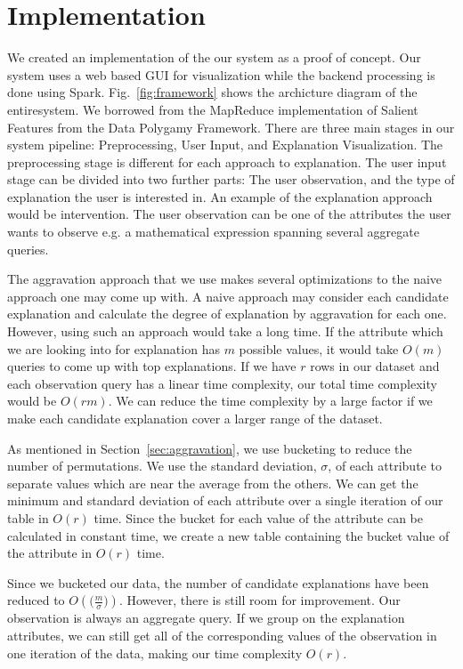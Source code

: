 \section{Implementation}
\label{sec:implementation}
We created an implementation of the our system as a proof of concept. Our system uses a web based GUI for visualization while the backend processing is done using Spark\citep{shanahan2015large}. Fig.~\ref{fig:framework} shows the archicture diagram of the entiresystem. We borrowed from the MapReduce implementation of Salient Features from the Data Polygamy Framework\citep{chirigati2016data}. There are three main stages in our system pipeline: Preprocessing, User Input, and Explanation Visualization. The preprocessing stage is different for each approach to explanation. The user input stage can be divided into two further parts: The user observation, and the type of explanation the user is interested in. An example of the explanation approach would be intervention. The user observation can be one of the attributes the user wants to observe e.g. a mathematical expression spanning several aggregate queries.


\label{aggravation_impl}
The aggravation approach that we use makes several optimizations to the naive approach one may come up with. A naive approach may consider each candidate explanation and calculate the degree of explanation by aggravation for each one. However, using such an approach would take a long time. If the attribute which we are looking into for explanation has $m$ possible values, it would take $O(m)$ queries to come up with top explanations. If we have $r$ rows in our dataset and each observation query has a linear time complexity, our total time complexity would be $O(rm)$. We can reduce the time complexity by a large factor if we make each candidate explanation cover a larger range of the dataset.

As mentioned in Section~\ref{sec:aggravation}, we use bucketing to reduce the number of permutations. We use the standard deviation, $\sigma$, of each attribute to separate values which are near the average from the others. We can get the minimum and standard deviation of each attribute over a single iteration of our table in $O(r)$ time. Since the bucket for each value of the attribute can be calculated in constant time, we create a new table containing the bucket value of the attribute in $O(r)$ time.

Since we bucketed our data, the number of candidate explanations have been reduced to $O(\big(\frac{m}{\sigma}\big))$. However, there is still room for improvement. Our observation is always an aggregate query. If we group on the explanation attributes, we can still get all of the corresponding values of the observation in one iteration of the data, making our time complexity $O(r)$.


